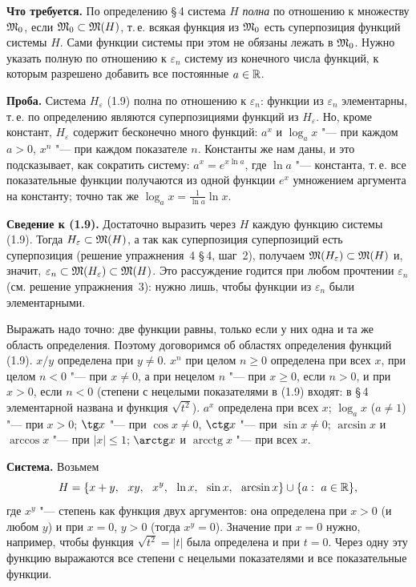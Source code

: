 \begin{solution}[4 (\S\,5)]
\textbf{Что требуется.} По определению \S\,4 система $H$ \emph{полна} по
отношению к множеству $\mathfrak M_0$, если $\mathfrak M_0\subset\mathfrak M(H)$, т.\,е. всякая функция
из $\mathfrak M_0$ есть суперпозиция функций системы $H$. Сами функции системы при
этом не обязаны лежать в $\mathfrak M_0$. Нужно указать полную по отношению
к $\varepsilon_n$ систему из конечного числа функций, к которым разрешено
добавить все постоянные $a\in\mathbb R$.

\textbf{Проба.} Система $H_\varepsilon$ (1.9) полна по отношению
к $\varepsilon_n$: функции из $\varepsilon_n$ элементарны, т.\,е. по
определению являются суперпозициями функций из $H_\varepsilon$. Но, кроме
констант, $H_\varepsilon$ содержит бесконечно много функций: $a^x$ и $\log_ax$
"--- при каждом $a>0$, $x^n$ "--- при каждом показателе $n$. Константы же нам
даны, и это подсказывает, как сократить систему: $a^x=e^{x\ln a}$, где
$\ln a$ "--- константа, т.\,е. все показательные функции получаются из одной
функции $e^x$ умножением аргумента на константу; точно так же
$\log_ax=\frac1{\ln a}\ln x$.

\textbf{Сведение к (1.9).} Достаточно выразить через $H$ каждую функцию
системы (1.9). Тогда $H_\varepsilon\subset\mathfrak M(H)$, а так как суперпозиция
суперпозиций есть суперпозиция (решение упражнения~4 \S\,4, шаг~2),
получаем $\mathfrak M(H_\varepsilon)\subset\mathfrak M(H)$ и, значит,
$\varepsilon_n\subset\mathfrak M(H_\varepsilon)\subset\mathfrak M(H)$. Это рассуждение годится
при любом прочтении $\varepsilon_n$ (см. решение упражнения~3): нужно лишь,
чтобы функции из $\varepsilon_n$ были элементарными.

Выражать надо точно: две функции равны, только если у них одна и та же
область определения. Поэтому договоримся об областях определения функций
(1.9). $x/y$ определена при $y\ne0$. $x^n$ при целом $n\ge0$ определена при
всех $x$, при целом $n<0$ "--- при $x\ne0$, а при нецелом $n$ "--- при $x\ge0$,
если $n>0$, и при $x>0$, если $n<0$ (степени с нецелыми показателями в (1.9)
входят: в \S\,4 элементарной названа и функция $\sqrt{t^2}$). $a^x$ определена
при всех $x$; $\log_ax$ ($a\ne1$) "--- при $x>0$; $\tg x$ "--- при $\cos x\ne0$,
$\ctg x$ "--- при $\sin x\ne0$; $\arcsin x$ и $\arccos x$ "--- при $|x|\le1$;
$\arctg x$ и $\operatorname{arcctg}x$ "--- при всех $x$.

\textbf{Система.} Возьмем
\[
H=\{x+y,\ \ xy,\ \ x^y,\ \ \ln x,\ \ \sin x,\ \ \arcsin x\}\cup\{a:\ a\in\R\},
\]
где $x^y$ "--- степень как функция двух аргументов: она определена при $x>0$
(и любом $y$) и при $x=0$, $y>0$ (тогда $x^y=0$). Значение при $x=0$ нужно,
например, чтобы функция $\sqrt{t^2}=|t|$ была определена и при $t=0$. Через
одну эту функцию выражаются все степени с нецелыми показателями и все
показательные функции.


\end{solution}
